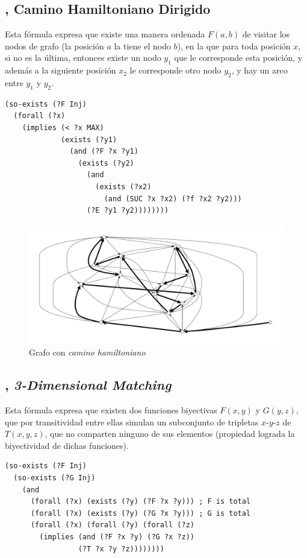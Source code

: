 \subsection{\CHD, Camino Hamiltoniano Dirigido}
Esta fórmula expresa que existe una manera ordenada $F(a,b)$ de visitar los nodos de grafo (la posición $a$ la tiene el nodo $b$), en
la que para toda posición $x$, si no es la última, entonces existe un nodo $y_1$ que le corresponde esta posición, y además
a la siguiente posición $x_2$ le corresponde otro nodo $y_2$, y hay un arco entre
$y_1$ y $y_2$.
\begin{verbatim}
(so-exists (?F Inj)
  (forall (?x)
    (implies (< ?x MAX)
             (exists (?y1)
               (and (?F ?x ?y1)
                 (exists (?y2)
                   (and
                     (exists (?x2) 
                       (and (SUC ?x ?x2) (?f ?x2 ?y2)))
                   (?E ?y1 ?y2))))))))
\end{verbatim}

\begin{figure}[h!]
\centering
\includegraphics[width=\textwidth]{figuras/chd.pdf}
\caption[Grafo con \textit{camino hamiltoniano}]{Grafo con \textit{camino hamiltoniano}}
\label{hamil}  
\end{figure}

\subsection{\TDM, \textit{3-Dimensional Matching}}
Esta fórmula expresa que existen dos funciones biyectivas $F(x,y)$ y $G(y,z)$, que por 
transitividad entre ellas simulan un subconjunto de tripletas $x$-$y$-$z$ de  $T(x,y,z)$,
que no comparten ninguno de sus elementos (propiedad lograda la biyectividad de
dichas funciones).
\begin{verbatim}
(so-exists (?F Inj)
  (so-exists (?G Inj)
    (and
      (forall (?x) (exists (?y) (?F ?x ?y))) ; F is total
      (forall (?x) (exists (?y) (?G ?x ?y))) ; G is total
      (forall (?x) (forall (?y) (forall (?z)
        (implies (and (?F ?x ?y) (?G ?x ?z))
                 (?T ?x ?y ?z))))))))
\end{verbatim}

